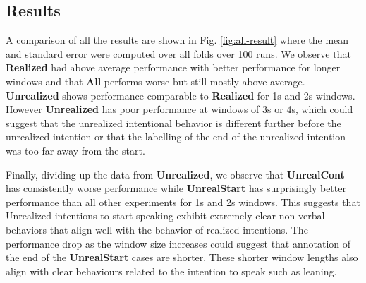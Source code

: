 \documentclass[manuscript,screen,review]{acmart}
\begin{document}

\subsection{Results}
\label{sec:res}
A comparison of all the results are shown in Fig. \ref{fig:all-result} where the mean and standard error were computed over all folds over 100 runs. We observe that \textbf{Realized} had above average performance with better performance for longer windows and that \textbf{All} performs worse but still mostly above average. \textbf{Unrealized} shows performance comparable to \textbf{Realized} for 1s and 2s windows. However \textbf{Unrealized} has poor performance at windows of 3s or 4s, which could suggest that the unrealized intentional behavior is different further before the unrealized intention or that the labelling of the end of the unrealized intention was too far away from the start. 

Finally, dividing up the data from \textbf{Unrealized}, we observe that \textbf{UnrealCont} has consistently worse performance while \textbf{UnrealStart} has surprisingly better performance than all other experiments for 1s and 2s windows. This suggests that Unrealized intentions to start speaking exhibit extremely clear non-verbal behaviors that align well with the behavior of realized intentions. The performance drop as the window size increases could suggest that annotation of the end of the \textbf{UnrealStart} cases are shorter. These shorter window lengths also align with clear behaviours related to the intention to speak such as leaning. 
\end{document}
